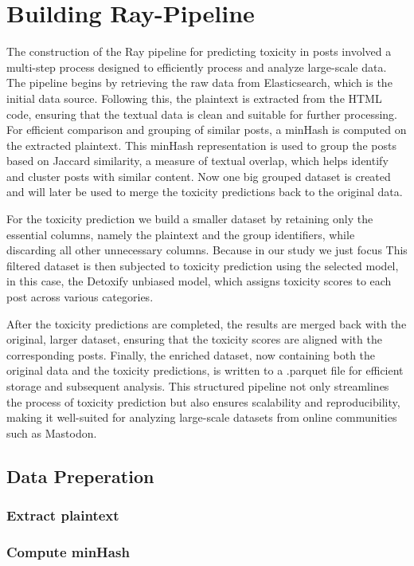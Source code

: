 \chapter{Building Ray-Pipeline} \label{ray-pipeline}

The construction of the Ray pipeline for predicting toxicity in posts involved a multi-step process designed to efficiently process and analyze large-scale data. The pipeline begins by retrieving the raw data from Elasticsearch, which is the initial data source. Following this, the plaintext is extracted from the HTML code, ensuring that the textual data is clean and suitable for further processing. For efficient comparison and grouping of similar posts, a minHash is computed on the extracted plaintext. This minHash representation is used to group the posts based on Jaccard similarity, a measure of textual overlap, which helps identify and cluster posts with similar content. Now one big grouped dataset is created and will later be used to merge the toxicity predictions back to the original data.

For the toxicity prediction we build a smaller dataset by retaining only the essential columns, namely the plaintext and the group identifiers, while discarding all other unnecessary columns. Because in our study we just focus This filtered dataset is then subjected to toxicity prediction using the selected model, in this case, the Detoxify unbiased model, which assigns toxicity scores to each post across various categories.

After the toxicity predictions are completed, the results are merged back with the original, larger dataset, ensuring that the toxicity scores are aligned with the corresponding posts. Finally, the enriched dataset, now containing both the original data and the toxicity predictions, is written to a .parquet file for efficient storage and subsequent analysis. This structured pipeline not only streamlines the process of toxicity prediction but also ensures scalability and reproducibility, making it well-suited for analyzing large-scale datasets from online communities such as Mastodon.

\section{Data Preperation}
\subsection{Extract plaintext}
\subsection{Compute minHash}
